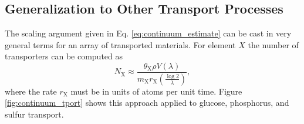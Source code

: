\documentclass[letterpaper, 10pt]{article}
\begin{document}
\subsection{Generalization to Other Transport Processes}
The scaling argument given in Eq. \ref{eq:continuum_estimate} can be cast in
very general terms for an array of transported materials. For element $X$ the
number of transporters can be computed as 
\begin{equation}
N_\text{X} \approx \frac{\theta_\text{X}\rho V(\lambda)}{m_\text{X}r_\text{X}\left(\frac{\log 2}{\lambda}\right)},
\end{equation}
where the rate $r_\text{X}$ must be in units of atoms per unit time. Figure
\ref{fig:continuum_tport} shows this approach applied to glucose, phosphorus,
and sulfur transport. 

\begin{figure}
\end{figure}
\end{document}
